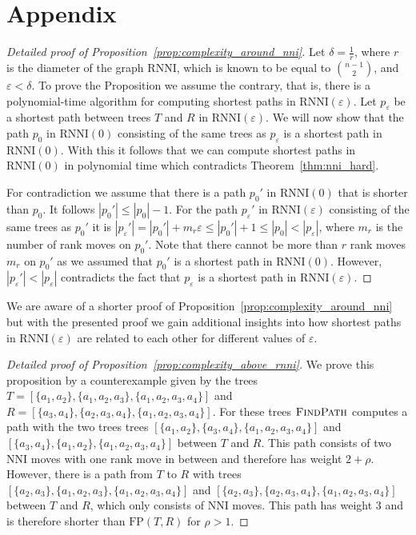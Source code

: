 \documentclass[11pt]{amsart}
\newcommand{\rnni}{\mathrm{RNNI}}
\newcommand{\findpath}{\textsc{FindPath}}
\newcommand{\nni}{\mathrm{NNI}}
\newcommand{\fp}{\mathrm{FP}}
\renewcommand{\epsilon}{\varepsilon}
\begin{document}
\section*{Appendix}
\renewcommand{\figurename}{Supplementary Figure}

\begin{proof}[Detailed proof of Proposition~\ref{prop:complexity_around_nni}]
Let $\delta = \frac1r$, where $r$ is the diameter of the graph $\rnni$, which is known \autocite{Collienne2019-ca} to be equal to $\binom{n - 1}{2}$, and $\epsilon < \delta$.
To prove the Proposition we assume the contrary, that is, there is a polynomial-time algorithm for computing shortest paths in $\rnni(\epsilon)$.
Let $p_\epsilon$ be a shortest path between trees $T$ and $R$ in $\rnni(\epsilon)$.
We will now show that the path $p_0$ in $\rnni(0)$ consisting of the same trees as $p_\epsilon$ is a shortest path in $\rnni(0)$.
With this it follows that we can compute shortest paths in $\rnni(0)$ in polynomial time which contradicts Theorem~\ref{thm:nni_hard}.

For contradiction we assume that there is a path $p_0'$ in $\rnni(0)$ that is shorter than $p_0$.
It follows $|p_0'| \leq |p_0| - 1$.
For the path $p_\epsilon'$ in $\rnni(\epsilon)$ consisting of the same trees as $p_0'$ it is $|p_\epsilon'| = |p_0'| + m_r \epsilon \leq |p_0'| + 1 \leq |p_0| < |p_\epsilon|$, where $m_r$ is the number of rank moves on $p_0'$.
Note that there cannot be more than $r$ rank moves $m_r$ on $p_0'$ as we assumed that $p_0'$ is a shortest path in $\rnni(0)$.
However, $|p_\epsilon'| < |p_\epsilon|$ contradicts the fact that $p_\epsilon$ is a shortest path in $\rnni(\epsilon)$.
\end{proof}

We are aware of a shorter proof of Proposition~\ref{prop:complexity_around_nni} but with the presented proof we gain additional insights into how shortest paths in $\rnni(\epsilon)$ are related to each other for different values of $\epsilon$.

\begin{proof}[Detailed proof of Proposition~\ref{prop:complexity_above_rnni}]
We prove this proposition by a counterexample given by the trees \break $T = [\{a_1,a_2\},\{a_1,a_2,a_3\},\{a_1,a_2,a_3,a_4\}]$ and $R = [\{a_3,a_4\},\{a_2,a_3,a_4\},\{a_1,a_2,a_3,a_4\}]$.
For these trees $\findpath$ computes a path with the two trees trees $[\{a_1,a_2\},\{a_3,a_4\},\{a_1,a_2,a_3,a_4\}]$ and \break $[\{a_3,a_4\},\{a_1,a_2\},\{a_1,a_2,a_3,a_4\}]$ between $T$ and $R$.
This path consists of two $\nni$ moves with one rank move in between and therefore has weight $2 + \rho$.
However, there is a path from $T$ to $R$ with trees $[\{a_2,a_3\},\{a_1,a_2,a_3\},\{a_1,a_2,a_3,a_4\}]$ and $[\{a_2,a_3\},\{a_2,a_3,a_4\},\{a_1,a_2,a_3,a_4\}]$ between $T$ and $R$, which only consists of $\nni$ moves.
This path has weight $3$ and is therefore shorter than $\fp(T,R)$ for $\rho > 1$.
\end{proof}
\end{document}
